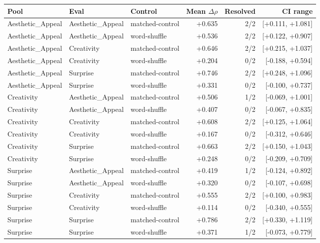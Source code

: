 \begin{tabular}{lllrrr}
\toprule
Pool & Eval & Control & Mean $\Delta\rho$ & Resolved & CI range \\
\midrule
Aesthetic\_Appeal & Aesthetic\_Appeal & matched-control & +0.635 & 2/2 & [+0.111, +1.081] \\
Aesthetic\_Appeal & Aesthetic\_Appeal & word-shuffle & +0.536 & 2/2 & [+0.122, +0.907] \\
Aesthetic\_Appeal & Creativity & matched-control & +0.646 & 2/2 & [+0.215, +1.037] \\
Aesthetic\_Appeal & Creativity & word-shuffle & +0.204 & 0/2 & [-0.188, +0.594] \\
Aesthetic\_Appeal & Surprise & matched-control & +0.746 & 2/2 & [+0.248, +1.096] \\
Aesthetic\_Appeal & Surprise & word-shuffle & +0.331 & 0/2 & [-0.100, +0.737] \\
Creativity & Aesthetic\_Appeal & matched-control & +0.506 & 1/2 & [-0.069, +1.001] \\
Creativity & Aesthetic\_Appeal & word-shuffle & +0.407 & 0/2 & [-0.067, +0.835] \\
Creativity & Creativity & matched-control & +0.608 & 2/2 & [+0.125, +1.064] \\
Creativity & Creativity & word-shuffle & +0.167 & 0/2 & [-0.312, +0.646] \\
Creativity & Surprise & matched-control & +0.663 & 2/2 & [+0.150, +1.043] \\
Creativity & Surprise & word-shuffle & +0.248 & 0/2 & [-0.209, +0.709] \\
Surprise & Aesthetic\_Appeal & matched-control & +0.419 & 1/2 & [-0.124, +0.892] \\
Surprise & Aesthetic\_Appeal & word-shuffle & +0.320 & 0/2 & [-0.107, +0.698] \\
Surprise & Creativity & matched-control & +0.555 & 2/2 & [+0.100, +0.983] \\
Surprise & Creativity & word-shuffle & +0.114 & 0/2 & [-0.340, +0.555] \\
Surprise & Surprise & matched-control & +0.786 & 2/2 & [+0.330, +1.119] \\
Surprise & Surprise & word-shuffle & +0.371 & 1/2 & [-0.073, +0.779] \\
\bottomrule
\end{tabular}

